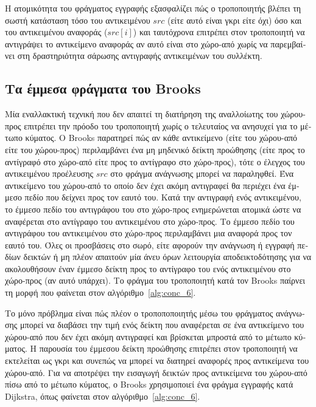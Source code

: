 \begin{greek}
Η ατομικότητα του φράγματος εγγραφής  εξασφαλίζει
πώς ο τροποποιητής βλέπει τη σωστή κατάσταση τόσο του αντικειμένου
$src$ (είτε αυτό είναι γκρι είτε όχι) όσο και του αντικειμένου
αναφοράς ($src[i]$) και ταυτόχρονα επιτρέπει στον τροποποιητή
να αντιγράψει το αντικείμενο αναφοράς αν αυτό είναι στο χώρο-από
χωρίς να παρεμβαίνει στη δραστηριότητα σάρωσης αντιγραφής
αντικειμένων του συλλέκτη.

\subsection{Τα έμμεσα φράγματα του Brooks}
Μία εναλλακτική τεχνική που δεν απαιτεί τη διατήρηση της αναλλοίωτης
του χώρου-προς επιτρέπει την πρόοδο του τροποποιητή χωρίς ο
τελευταίος να ανησυχεί για το μέτωπο κύματος. Ο Brooks
\cite{DBLP:conf/lfp/Brooks84} παρατηρεί πώς αν κάθε αντικείμενο
(είτε του χώρου-από είτε του χώρου-προς) περιλαμβάνει ένα μη
μηδενικό δείκτη προώθησης (είτε προς το αντίγραφό στο χώρο-από
είτε προς το αντίγραφο στο χώρο-προς), τότε ο έλεγχος του
αντικειμένου προέλευσης $src$ στο φράγμα ανάγνωσης μπορεί να
παραληφθεί. Ένα αντικείμενο του χώρου-από το οποίο δεν έχει
ακόμη αντιγραφεί θα περιέχει ένα έμμεσο πεδίο που δείχνει προς
τον εαυτό του. Κατά την αντιγραφή ενός αντικειμένου, το έμμεσο
πεδίο του αντιγράφου του στο χώρο-προς ενημερώνεται ατομικά
ώστε να αναφέρεται στο αντίγραφο του αντικειμένου στο χώρο-προς.
Το έμμεσο πεδίο του αντιγράφου του αντικειμένου στο χώρο-προς
περιλαμβάνει μια αναφορά προς τον εαυτό του. Όλες οι προσβάσεις
στο σωρό, είτε αφορούν την ανάγνωση ή εγγραφή πεδίων δεικτών
ή μη πλέον απαιτούν μία άνευ όρων λειτουργία αποδεικτοδότησης
για να ακολουθήσουν έναν έμμεσο δείκτη προς το αντίγραφο του
ενός αντικειμένου στο χώρο-προς (αν αυτό υπάρχει). Το φράγμα
 του τροποποιητή κατά τον Brooks παίρνει τη
μορφή που φαίνεται στον αλγόριθμο~\ref{alg:conc_6}.

Το μόνο πρόβλημα είναι πώς πλέον ο τροποποποιητής μέσω του
φράγματος ανάγνωσης μπορεί να διαβάσει την τιμή ενός δείκτη
που αναφέρεται σε ένα αντικείμενο του χώρου-από που δεν έχει
ακόμη αντιγραφεί και βρίσκεται μπροστά από το μέτωπο κύματος.
Η παρουσία του έμμεσου δείκτη προώθησης επιτρέπει στον τροποποιητή
να εκτελείται ως γκρι και συνεπώς να μπορεί να διατηρεί αναφορές
προς αντικείμενα του χώρου-από. Για να αποτρέψει την εισαγωγή
δεικτών προς αντικείμενα του χώρου-από πίσω από το μέτωπο
κύματος, ο Brooks χρησιμοποιεί ένα φράγμα εγγραφής κατά
Dijkstra, όπως φαίνεται στον αλγόριθμο~\ref{alg:conc_6}.


\end{greek}
